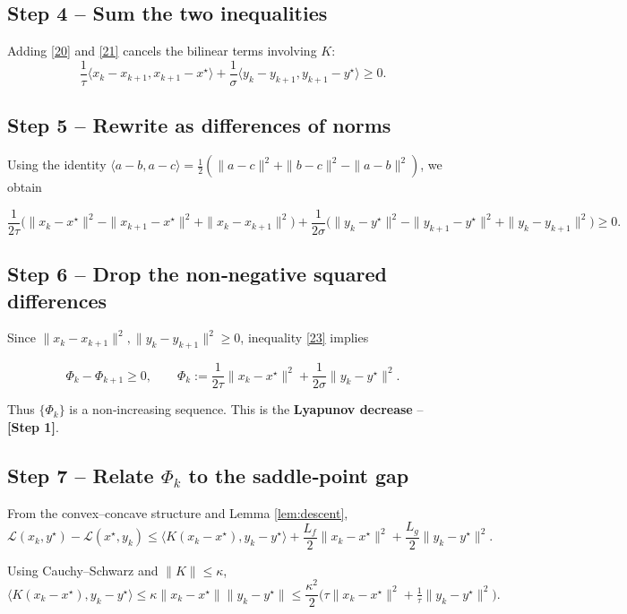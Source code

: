 \documentclass{article}
\begin{document}
\subsection*{Step 4 – Sum the two inequalities}
Adding \eqref{20} and \eqref{21} cancels the bilinear terms involving $K$:
\[
\frac{1}{\tau}\langle x_{k}-x_{k+1},x_{k+1}-x^{\star}\rangle
+\frac{1}{\sigma}\langle y_{k}-y_{k+1},y_{k+1}-y^{\star}\rangle\ge 0. \tag{22}
\]

\subsection*{Step 5 – Rewrite as differences of norms}
Using the identity $\langle a-b,a-c\rangle=\tfrac12(\|a-c\|^{2}+\|b-c\|^{2}-\|a-b\|^{2})$, we obtain

\[
\frac{1}{2\tau}\bigl(\|x_{k}-x^{\star}\|^{2}-\|x_{k+1}-x^{\star}\|^{2}+\|x_{k}-x_{k+1}\|^{2}\bigr)
+\frac{1}{2\sigma}\bigl(\|y_{k}-y^{\star}\|^{2}-\|y_{k+1}-y^{\star}\|^{2}+\|y_{k}-y_{k+1}\|^{2}\bigr)\ge 0. \tag{23}
\]

\subsection*{Step 6 – Drop the non‑negative squared differences}
Since $\|x_{k}-x_{k+1}\|^{2},\|y_{k}-y_{k+1}\|^{2}\ge0$, inequality \eqref{23} implies

\[
\Phi_{k}-\Phi_{k+1}\ge 0,
\qquad
\Phi_{k}:=\frac{1}{2\tau}\|x_{k}-x^{\star}\|^{2}
+\frac{1}{2\sigma}\|y_{k}-y^{\star}\|^{2}.
\tag{24}
\]

Thus $\{\Phi_{k}\}$ is a non‑increasing sequence.  This is the \textbf{Lyapunov decrease} – \textbf{[Step 1]}.

\subsection*{Step 7 – Relate $\Phi_{k}$ to the saddle‑point gap}
From the convex–concave structure and Lemma \ref{lem:descent},
\[
\mathcal L(x_{k},y^{\star})-\mathcal L(x^{\star},y_{k})
\le \langle K(x_{k}-x^{\star}),y_{k}-y^{\star}\rangle
+ \frac{L_{f}}{2}\|x_{k}-x^{\star}\|^{2}
+ \frac{L_{g}}{2}\|y_{k}-y^{\star}\|^{2}. \tag{25}
\]

Using Cauchy–Schwarz and $\|K\|\le\kappa$,
\[
\langle K(x_{k}-x^{\star}),y_{k}-y^{\star}\rangle
\le \kappa\|x_{k}-x^{\star}\|\|y_{k}-y^{\star}\|
\le \frac{\kappa^{2}}{2}\bigl(\tau\|x_{k}-x^{\star}\|^{2}+\tfrac{1}{\tau}\|y_{k}-y^{\star}\|^{2}\bigr). \tag{26}
\]
\end{document}
